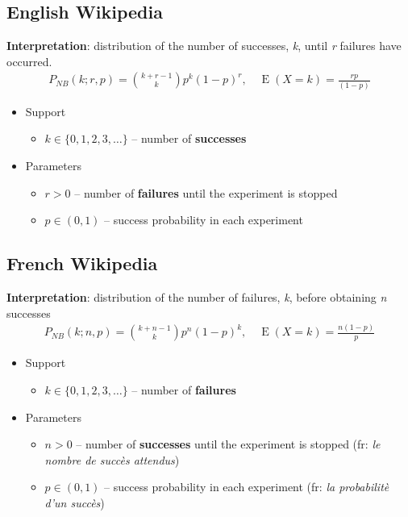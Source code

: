 \subsection*{English Wikipedia}
\textbf{Interpretation}: distribution of the number of successes, \emph{k}, until \emph{r} failures have occurred.
\begin{align*}
P_{N\!B}(k;r,p) = {k + r - 1 \choose k} p^k (1-p)^r, \quad \operatorname E(X\!=\!k)=\frac{rp}{(1-p)}
\end{align*}
\begin{itemize}
\item 
Support
\begin{itemize}
\item 
$k \in \{ 0, 1, 2, 3, \dots\}$ -- number of \textbf{successes}
\end{itemize}
\item 
Parameters 
\begin{itemize}
\item 
$r > 0$ -- number of \textbf{failures} until the experiment is stopped
\item 
$p \in (0,1)$ -- success probability in each experiment
\end{itemize}
\end{itemize}


\subsection*{French Wikipedia}
\textbf{Interpretation}: distribution of the number of failures, \emph{k}, before obtaining \emph{n} successes
\begin{align*}
P_{N\!B}(k;n,p) = {k + n - 1 \choose k} p^n (1-p)^k, \quad \operatorname E(X\!=\!k)=\frac{n(1-p)}{p}
\end{align*}
\begin{itemize}
\item 
Support
\begin{itemize}
\item 
$k \in \{ 0, 1, 2, 3, \dots\}$ -- number of \textbf{failures}
\end{itemize}
\item 
Parameters 
\begin{itemize}
\item 
$n > 0$ -- number of \textbf{successes} until the experiment is stopped (fr: \emph{le nombre de succ\`es attendus})
\item 
$p \in (0,1)$ -- success probability in each experiment (fr: \emph{la probabilit\`e d'un succ\`es})
\end{itemize}
\end{itemize}

